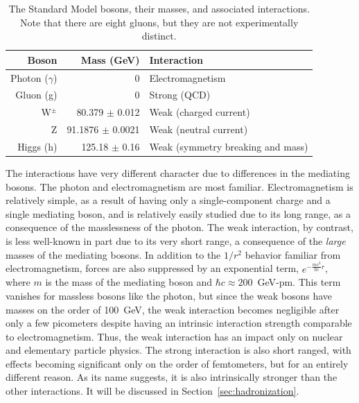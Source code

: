  \begin{table}
    \centering
    \begin{tabular}{r r l}
      Boson             & Mass (GeV) \cite{pdg} & Interaction \\
      \hline
      Photon ($\gamma$) & 0                     & Electromagnetism \\
      Gluon (g)         & 0                     & Strong (QCD) \\
      W$^{\pm}$         & 80.379 $\pm$ 0.012    & Weak (charged current) \\
      Z                 & 91.1876 $\pm$ 0.0021  & Weak (neutral current) \\
      Higgs (h)         & 125.18 $\pm$ 0.16     & Weak (symmetry breaking and mass) \\
    \end{tabular}
    \caption[Table of Standard Model bosons.]
            {The Standard Model bosons, their masses, and associated interactions. Note that there are eight gluons, but they are not experimentally distinct.}
            \label{tab:bosons}
  \end{table}

  The interactions have very different character due to differences in the mediating bosons.
  The photon and electromagnetism are most familiar.
  Electromagnetism is relatively simple, as a result of having only a single-component charge and a single mediating boson, and is relatively easily studied due to its long range, as a consequence of the masslessness of the photon.
  The weak interaction, by contrast, is less well-known in part due to its very short range, a consequence of the {\it large} masses of the mediating bosons.
  In addition to the $1/r^2$ behavior familiar from electromagnetism, forces are also suppressed by an exponential term, $e^{-\frac{mc^2}{\hbar c}r}$, where $m$ is the mass of the mediating boson and $\hbar c \approx 200$~GeV-pm.
  This term vanishes for massless bosons like the photon, but since the weak bosons have masses on the order of 100~GeV, the weak interaction becomes negligible after only a few picometers despite having an intrinsic interaction strength comparable to electromagnetism.
  Thus, the weak interaction has an impact only on nuclear and elementary particle physics.
  The strong interaction is also short ranged, with effects becoming significant only on the order of femtometers, but for an entirely different reason.
  As its name suggests, it is also intrinsically stronger than the other interactions.
  It will be discussed in Section~\ref{sec:hadronization}.

